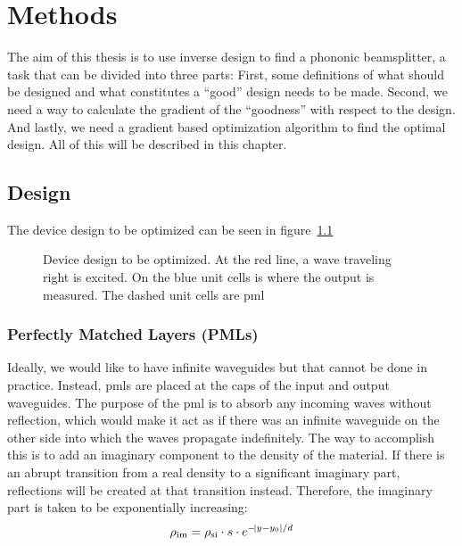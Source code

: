 \chapter{Methods}

The aim of this thesis is to use inverse design to find a phononic beamsplitter,
a task that can be divided into three parts: 
First, some definitions of what
should be designed and what constitutes a ``good'' design needs to be made.
Second, we need a way to calculate the gradient of the ``goodness'' with respect
to the design.
And lastly, we need a gradient based optimization algorithm to find the optimal
design.
All of this will be described in this chapter.

\section{Design}

The device design to be optimized can be seen in figure~\ref{fig:bs-design}

\begin{figure}[htpb]
	\centering
	
	\caption{
		Device design to be optimized.
		At the red line, a wave traveling right is excited.
		On the blue unit cells is where the output is measured.
		The dashed unit cells are \gls{pml}
	}
	\label{fig:bs-design}
\end{figure}


\subsection{Perfectly Matched Layers (PMLs)}

Ideally, we would like to have infinite waveguides but that cannot be done in
practice.
Instead, \glspl{pml} are placed at the caps of the input and output waveguides.
The purpose of the \gls{pml} is to absorb any incoming waves without reflection,
which would make it act as if there was an infinite waveguide on the other side
into which the waves propagate indefinitely.
The way to accomplish this is to add an imaginary component to the density of
the material.
If there is an abrupt transition from a real density to a significant imaginary
part, reflections will be created at that transition instead.
Therefore, the imaginary part is taken to be exponentially increasing:
\begin{equation}
	\rho_\text{im} = \rho_\text{si} \cdot s \cdot e^{-\abs{y-y_0} / d}
\end{equation}


